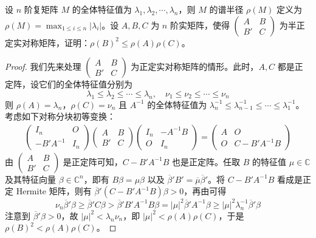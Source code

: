 \documentclass[../../main.tex]{subfiles}%
\begin{document}
\begin{proposition}\label{proposition:例9.57}
设 \(n\) 阶复矩阵 \(M\) 的全体特征值为 \(\lambda_1,\lambda_2,\cdots,\lambda_n\)，则 \(M\) 的谱半径 \(\rho(M)\) 定义为 \(\rho(M)=\max_{1\leqslant  i \leqslant  n}|\lambda_i|\)。设 \(A,B,C\) 为 \(n\) 阶实矩阵，使得 \(\begin{pmatrix}
A & B \\
B' & C
\end{pmatrix}\) 为半正定实对称矩阵，证明：\(\rho(B)^2 \leqslant  \rho(A)\rho(C)\)。
\end{proposition}
\begin{proof}

我们先来处理 \(\begin{pmatrix}
A & B \\
B' & C
\end{pmatrix}\) 为正定实对称矩阵的情形。此时，\(A,C\) 都是正定阵，设它们的全体特征值分别为
\[
\lambda_1 \leqslant  \lambda_2 \leqslant  \cdots \leqslant  \lambda_n,\quad \nu_1 \leqslant  \nu_2 \leqslant  \cdots \leqslant  \nu_n
\]
则 \(\rho(A) = \lambda_n\)，\(\rho(C) = \nu_n\) 且 \(A^{-1}\) 的全体特征值为 \(\lambda_n^{-1} \leqslant  \lambda_{n - 1}^{-1} \leqslant  \cdots \leqslant  \lambda_1^{-1}\)。考虑如下对称分块初等变换：
\begin{align*}
\begin{pmatrix}
I_n & O \\
-B'A^{-1} & I_n
\end{pmatrix}
\begin{pmatrix}
A & B \\
B' & C
\end{pmatrix}
\begin{pmatrix}
I_n & -A^{-1}B \\
O & I_n
\end{pmatrix}
=
\begin{pmatrix}
A & O \\
O & C - B'A^{-1}B
\end{pmatrix}
\end{align*}
由 \(\begin{pmatrix}
A & B \\
B' & C
\end{pmatrix}\) 是正定阵可知，\(C - B'A^{-1}B\) 也是正定阵。任取 \(B\) 的特征值 \(\mu \in \mathbb{C}\) 及其特征向量 \(\beta \in \mathbb{C}^n\)，即有 \(B\beta = \mu\beta\) 以及 \(\overline{\beta}'B' = \overline{\mu}\overline{\beta}'\)。将 \(C - B'A^{-1}B\) 看成是正定 Hermite 矩阵，则有 \(\overline{\beta}'(C - B'A^{-1}B)\beta > 0\)，再由可得
\[
\nu_n\overline{\beta}'\beta \geqslant  \overline{\beta}'C\beta > \overline{\beta}'B'A^{-1}B\beta = |\mu|^2\overline{\beta}'A^{-1}\beta \geqslant  |\mu|^2\lambda_n^{-1}\overline{\beta}'\beta
\]
注意到 \(\overline{\beta}'\beta > 0\)，故 \(|\mu|^2 < \lambda_n\nu_n\)，即 \(|\mu|^2 < \rho(A)\rho(C)\)，于是 \(\rho(B)^2 < \rho(A)\rho(C)\)。


\end{proof}
\end{document}
